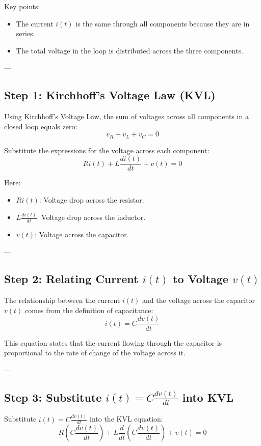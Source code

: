 \documentclass[12pt]{article}
\begin{document}
Key points:
\begin{itemize}
    \item The current \( i(t) \) is the same through all components because they are in series.
    \item The total voltage in the loop is distributed across the three components.
\end{itemize}

---

\subsection*{Step 1: Kirchhoff's Voltage Law (KVL)}

Using Kirchhoff’s Voltage Law, the sum of voltages across all components in a closed loop equals zero:
\[
v_R + v_L + v_C = 0
\]

Substitute the expressions for the voltage across each component:
\[
R i(t) + L \frac{di(t)}{dt} + v(t) = 0 \tag{1}
\]

Here:
\begin{itemize}
    \item \( R i(t) \): Voltage drop across the resistor.
    \item \( L \frac{di(t)}{dt} \): Voltage drop across the inductor.
    \item \( v(t) \): Voltage across the capacitor.
\end{itemize}

---

\subsection*{Step 2: Relating Current \( i(t) \) to Voltage \( v(t) \)}

The relationship between the current \( i(t) \) and the voltage across the capacitor \( v(t) \) comes from the definition of capacitance:
\[
i(t) = C \frac{dv(t)}{dt} \tag{2}
\]

This equation states that the current flowing through the capacitor is proportional to the rate of change of the voltage across it.

---

\subsection*{Step 3: Substitute \( i(t) = C \frac{dv(t)}{dt} \) into KVL}

Substitute \( i(t) = C \frac{dv(t)}{dt} \) into the KVL equation:
\[
R \left(C \frac{dv(t)}{dt}\right) + L \frac{d}{dt} \left(C \frac{dv(t)}{dt}\right) + v(t) = 0
\]
\end{document}
